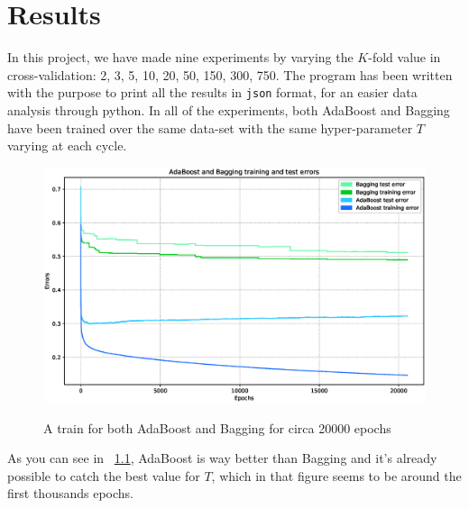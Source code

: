 
\chapter{Results}

In this project, we have made nine experiments by varying the $K$-fold value in cross-validation: 2, 3, 5, 10, 20, 50, 150, 300, 750. The program has been written with the purpose to print all the results in \texttt{json} format, for an easier data analysis through python. In all of the experiments, both AdaBoost and Bagging have been trained over the same data-set with the same hyper-parameter $T$ varying at each cycle.\\
\begin{figure}[htpb]
	\centering
	\includegraphics[scale=0.35]{figs/report_k20.eps}
	\label{fig:k20}
	\caption{A train for both AdaBoost and Bagging for circa 20000 epochs}
\end{figure}
As you can see in \figurename~\ref{fig:k20}, AdaBoost is way better than Bagging and it's already possible to catch the best value for $T$, which in that figure seems to be around the first thousands epochs. 
